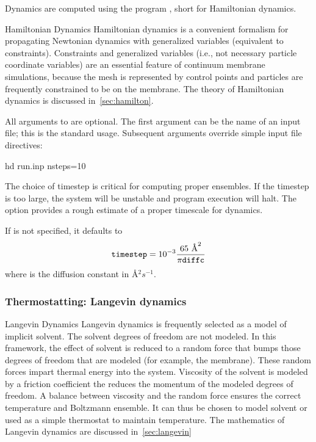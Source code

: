

Dynamics are computed using the program , short for Hamiltonian dynamics. 

\begin{bcomment}{Hamiltonian Dynamics}
Hamiltonian dynamics is a convenient formalism for propagating Newtonian dynamics with generalized variables (equivalent to constraints). Constraints and generalized variables (i.e., not necessary particle coordinate variables) are an essential feature of continuum membrane simulations, because the mesh is represented by control points and particles are frequently constrained to be on the membrane. The theory of Hamiltonian dynamics is discussed in~\cref{sec:hamilton}. 
\end{bcomment}

All arguments to  are optional.
The first argument can be the name of an input file; this is the standard usage.
Subsequent arguments override simple input file directives:
\begin{command}
hd run.inp nsteps=10
\label{cmd:hd}
\end{command}



The choice of timestep is critical for computing proper ensembles. 
If the timestep is too large, the system will be unstable and program execution will halt.
The option  provides a rough estimate of a proper timescale for dynamics.

If  is not specified, it defaults to
\begin{equation}
\textrm{\texttt{timestep}} = 10^{-3} \frac{65\textrm{ \AA}^2}{\pi \textrm{\texttt{diffc}}}
\end{equation}
where  is the diffusion constant in \AA$^2 s^{-1}$.

\subsubsection{Thermostatting: Langevin dynamics}

\begin{bcomment}{Langevin Dynamics}
Langevin dynamics is frequently selected as a model of implicit solvent.
The solvent degrees of freedom are not modeled.
In this framework, the effect of solvent is reduced to a random force that bumps those degrees of freedom that are modeled (for example, the membrane).
These random forces impart thermal energy into the system.
Viscosity of the solvent is modeled by a friction coefficient the reduces the momentum of the modeled degrees of freedom.
A balance between viscosity and the random force ensures the correct temperature and Boltzmann ensemble.
It can thus be chosen to model solvent or used as a simple thermostat to maintain temperature.
The mathematics of Langevin dynamics are discussed in~\cref{sec:langevin}
\end{bcomment}

